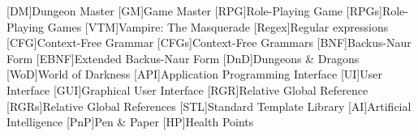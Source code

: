[DM]{Dungeon Master}
[GM]{Game Master}
[RPG]{Role-Playing Game}
[RPGs]{Role-Playing Games}
[VTM]{Vampire: The Masquerade}
[Regex]{Regular expressions}
[CFG]{Context-Free Grammar}
[CFGs]{Context-Free Grammars}
[BNF]{Backus-Naur Form}
[EBNF]{Extended Backus-Naur Form}
[DnD]{Dungeons \& Dragons}
[WoD]{World of Darkness}
[API]{Application Programming Interface}
[UI]{User Interface}
[GUI]{Graphical User Interface}
[RGR]{Relative Global Reference}
[RGRs]{Relative Global References}
[STL]{Standard Template Library}
[AI]{Artificial Intelligence}
[PnP]{Pen \& Paper}
[HP]{Health Points}
